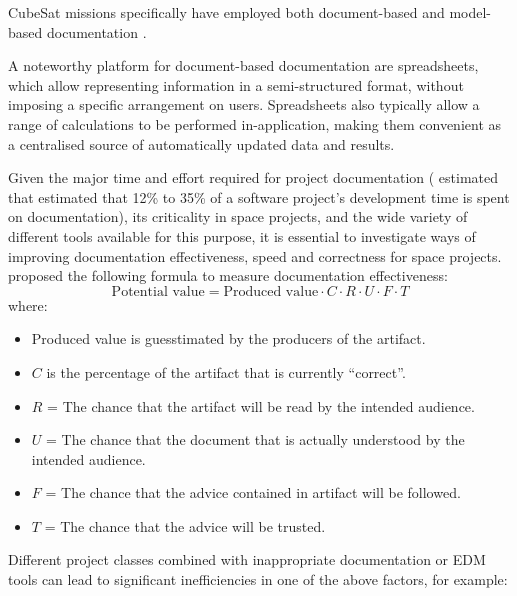 \documentclass[]{iac}
\begin{document}
CubeSat missions specifically have employed both document-based and model-based documentation \autocite{coyle_eecsat_2020,czech_first-move_nodate,slavinskis_estcube-1_2015}.

A noteworthy platform for document-based documentation are spreadsheets, which allow representing information in a semi-structured format, without imposing a specific arrangement on users. Spreadsheets also typically allow a range of calculations to be performed in-application, making them convenient as a centralised source of automatically updated data and results.

Given the major time and effort required for project documentation (\citeauthor{sanchez-rosado_assessing_2009} \autocite{sanchez-rosado_assessing_2009} estimated that estimated that 12\% to 35\% of a software
project’s development time is spent on documentation), its criticality in space projects, and the wide variety of different tools available for this purpose, it is essential to investigate ways of improving documentation effectiveness, speed and correctness for space projects. \citeauthor{ambler_strategies_2008} \autocite{ambler_strategies_2008} proposed the following formula to measure documentation effectiveness:
\begin{equation}
\text{Potential value} = \text{Produced value} \cdot C \cdot R \cdot U \cdot F \cdot T
\end{equation}
where:
\begin{itemize}[itemsep=-1ex]
    \item Produced value is guesstimated by the producers of the artifact.
    \item \(C\) is the percentage of the artifact that is currently “correct”.
    \item \(R\) = The chance that the artifact will be read by the intended audience.
    \item \(U\) = The chance that the document that is actually understood by the intended audience.
    \item \(F\) = The chance that the advice contained in artifact will be followed.
    \item \(T\) = The chance that the advice will be trusted.
\end{itemize}
Different project classes combined with inappropriate documentation or \ac{EDM} tools can lead to significant inefficiencies in one of the above factors, for example:
\end{document}
